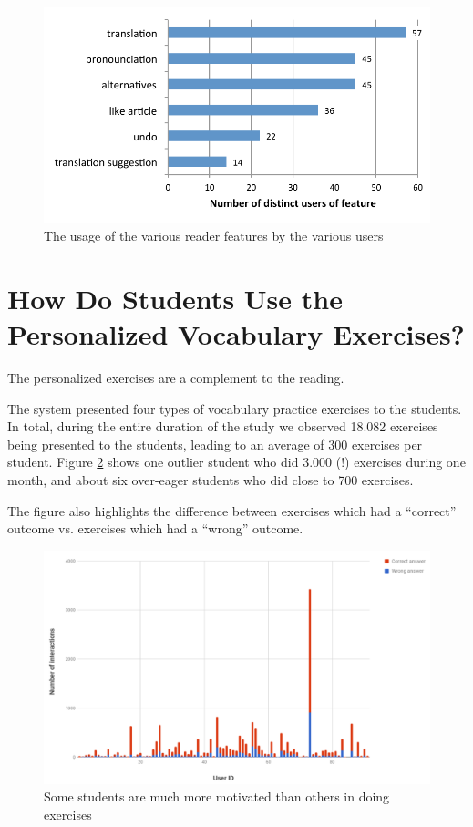   \begin{figure}[h!]
  \centering
    \includegraphics[width=0.9\columnwidth]{figures/reader_feature_usage_per_user}
    \caption{The usage of the various reader features by the various users }
    \label{fig:usage_per_user}
  \end{figure}



\newpage
\section{How Do Students Use the Personalized Vocabulary Exercises?}

The personalized exercises are a complement to the reading. 

The system presented four types of vocabulary practice exercises to the students. In total, during the entire duration of the study we observed 18.082 exercises being presented to the students, leading to an average of 300 exercises per student. Figure \ref{fig:ex_interactions} shows one outlier student who did 3.000 (!) exercises during one month, and about six over-eager students who did close to 700 exercises. 

The figure also highlights the difference between exercises which had a ``correct'' outcome vs. exercises which had a ``wrong'' outcome. 


  \begin{figure}[h!]
  \centering
    \includegraphics[width=\columnwidth]{figures/exercise_interactions_count.png}
    \caption{Some students are much more motivated than others in doing exercises }
    \label{fig:ex_interactions}
  \end{figure}


